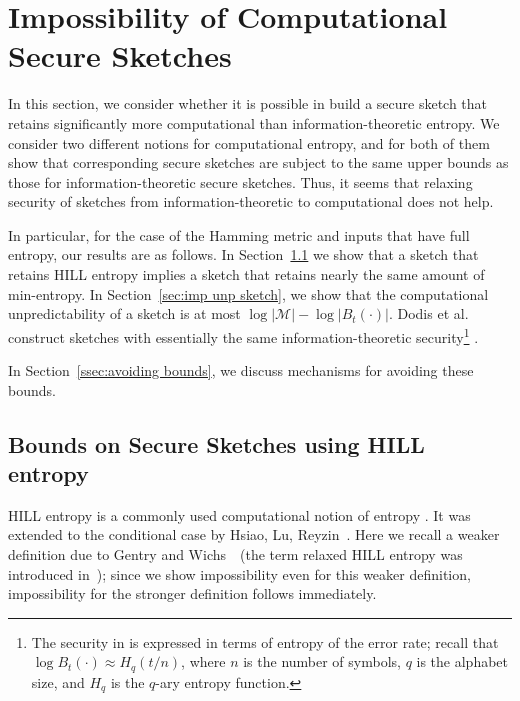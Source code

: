 \documentclass[11pt]{article}
\newcommand{\secref}[1]{\mbox{Section~\ref{#1}}}
\begin{document}
\section{Impossibility of Computational Secure Sketches}
\label{sec:impossCompSecSketch}
In this section, we consider whether it is possible in build a secure sketch that retains significantly more computational than information-theoretic entropy.  We consider two different notions for computational entropy, and for both of them show that corresponding secure sketches are subject to the same upper bounds as those for information-theoretic secure sketches. Thus, it seems that relaxing security of sketches from information-theoretic to computational does not help.

In particular, for the case of the Hamming metric and inputs that have full entropy, our results are as follows.  In  \secref{sec:imp HILL sketch} we show that a sketch that retains HILL entropy implies a sketch that retains nearly the same amount of min-entropy.  In \secref{sec:imp unp sketch}, we show that the computational unpredictability of a sketch is at most $\log |\mathcal{M}| - \log |B_t(\cdot)|$. Dodis et al. \cite[Section 8.2]{DBLP:journals/siamcomp/DodisORS08}  construct sketches with essentially the same information-theoretic security\footnote{The security in  \cite[Section 8.2]{DBLP:journals/siamcomp/DodisORS08}  is expressed in terms of entropy of the error rate; recall that $\log B_t(\cdot)\approx H_q(t/n)$, where $n$ is the number of symbols, $q$ is the alphabet size, and $H_q$ is the $q$-ary entropy function.} . 


In \secref{ssec:avoiding bounds}, we discuss mechanisms for avoiding these bounds.


\subsection{Bounds on Secure Sketches using HILL entropy}
\label{sec:imp HILL sketch}
HILL entropy is a commonly used computational notion of entropy \cite{DBLP:journals/siamcomp/HastadILL99}.  It was extended to the conditional case by Hsiao, Lu, Reyzin~\cite{DBLP:conf/eurocrypt/HsiaoLR07}. Here we recall a weaker definition due to Gentry and Wichs~\cite{gentry2011separating}~(the term relaxed HILL entropy was introduced in~\cite{reyzin2011some}); since we show impossibility even for this weaker definition, impossibility for the stronger definition follows immediately.
\end{document}
